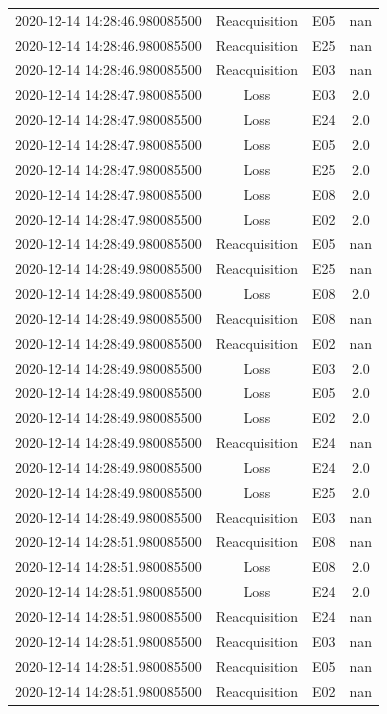 \begin{enumerate}
\begin{longtabu}{cccc}
2020{-}12{-}14 14:28:46.980085500&Reacquisition&E05&nan\\%
2020{-}12{-}14 14:28:46.980085500&Reacquisition&E25&nan\\%
2020{-}12{-}14 14:28:46.980085500&Reacquisition&E03&nan\\%
2020{-}12{-}14 14:28:47.980085500&Loss&E03&2.0\\%
2020{-}12{-}14 14:28:47.980085500&Loss&E24&2.0\\%
2020{-}12{-}14 14:28:47.980085500&Loss&E05&2.0\\%
2020{-}12{-}14 14:28:47.980085500&Loss&E25&2.0\\%
2020{-}12{-}14 14:28:47.980085500&Loss&E08&2.0\\%
2020{-}12{-}14 14:28:47.980085500&Loss&E02&2.0\\%
2020{-}12{-}14 14:28:49.980085500&Reacquisition&E05&nan\\%
2020{-}12{-}14 14:28:49.980085500&Reacquisition&E25&nan\\%
2020{-}12{-}14 14:28:49.980085500&Loss&E08&2.0\\%
2020{-}12{-}14 14:28:49.980085500&Reacquisition&E08&nan\\%
2020{-}12{-}14 14:28:49.980085500&Reacquisition&E02&nan\\%
2020{-}12{-}14 14:28:49.980085500&Loss&E03&2.0\\%
2020{-}12{-}14 14:28:49.980085500&Loss&E05&2.0\\%
2020{-}12{-}14 14:28:49.980085500&Loss&E02&2.0\\%
2020{-}12{-}14 14:28:49.980085500&Reacquisition&E24&nan\\%
2020{-}12{-}14 14:28:49.980085500&Loss&E24&2.0\\%
2020{-}12{-}14 14:28:49.980085500&Loss&E25&2.0\\%
2020{-}12{-}14 14:28:49.980085500&Reacquisition&E03&nan\\%
2020{-}12{-}14 14:28:51.980085500&Reacquisition&E08&nan\\%
2020{-}12{-}14 14:28:51.980085500&Loss&E08&2.0\\%
2020{-}12{-}14 14:28:51.980085500&Loss&E24&2.0\\%
2020{-}12{-}14 14:28:51.980085500&Reacquisition&E24&nan\\%
2020{-}12{-}14 14:28:51.980085500&Reacquisition&E03&nan\\%
2020{-}12{-}14 14:28:51.980085500&Reacquisition&E05&nan\\%
2020{-}12{-}14 14:28:51.980085500&Reacquisition&E02&nan\\%

\end{longtabu}
\end{enumerate}
